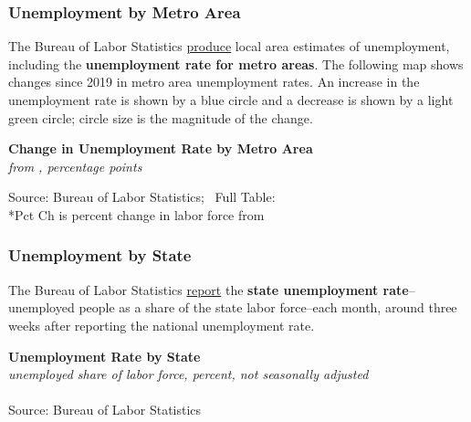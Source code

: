 \documentclass{report}
\newcommand{\tbllink}[1]{\href{https://raw.githubusercontent.com/bdecon/US-chartbook/master/chartbook/data/#1}{\faTable}}
\begin{document}
{\begin{minipage}{0.76\textwidth}
\subsubsection*{Unemployment by Metro Area}
\vspace{-1mm}

\small The Bureau of Labor Statistics \href{https://www.bls.gov/lau/}{produce} local area estimates of unemployment, including the \textbf{unemployment rate for metro areas}. The following map shows changes since 2019 in metro area unemployment rates. An increase in the unemployment rate is shown by a blue circle and a decrease is shown by a light green circle; circle size is the magnitude of the change. 


\end{minipage}
\vspace{1mm}

\begin{minipage}{0.82\textwidth}
\normalsize \textbf{Change in Unemployment Rate by Metro Area}\\
\footnotesize{\textit{from \unskip, percentage points}}
\vspace{-3mm}

\hspace*{-8mm} 
\vspace{-3mm}

\footnotesize{Source: Bureau of Labor Statistics; \ Full Table: \tbllink{msa_unemp_rate.csv} \\ \**Pct Ch is percent change in labor force from }
\end{minipage}
\newpage
\begin{minipage}{0.76\textwidth} 
\subsubsection*{Unemployment by State}
\small The Bureau of Labor Statistics \href{https://www.bls.gov/lau/}{report} the \textbf{state unemployment rate}--unemployed people as a share of the state labor force--each month, around three weeks after reporting the national unemployment rate. 

\normalsize \textbf{Unemployment Rate by State}\\
\footnotesize{\textit{unemployed share of labor force, percent, not seasonally adjusted}}\\
\vspace{-2mm}
\hspace{-10mm}  \\
\footnotesize{Source: Bureau of Labor Statistics} \hspace{72mm} \tbllink{state_unrate.csv}
\end{minipage}
\newpage
\begin{minipage}{0.76\textwidth}   

\end{minipage}}
\end{document}
